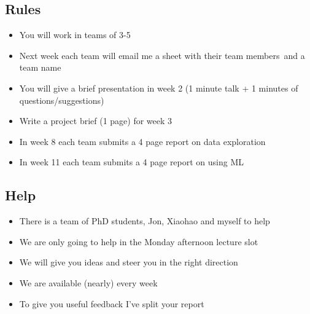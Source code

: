 \setcounter{outlineitem}{1}

\Outline %

\begin{slide}
\section{Rules}

\begin{PauseHighLight}
  \begin{itemize}
  \item You will work in teams of 3-5\pause
  \item Next week each team will email me a sheet with their team
    members\pause\ and a team name\pauseb
  \item You will give a brief presentation in week 2 (1 minute talk + 1
    minutes of questions/suggestions)\pause
  \item Write a project brief (1 page) for week 3\pause
  \item In week 8 each team submits a 4 page report on data exploration\pause
  \item In week 11 each team submits a 4 page report on using ML\pause
  \end{itemize}
\end{PauseHighLight}

\end{slide}


\begin{slide}
\section{Help}

\begin{PauseHighLight}
  \begin{itemize}
  \item There is a team of PhD students, Jon, Xiaohao and myself to help\pause
  \item We are only going to help in the Monday afternoon lecture slot\pause
  \item We will give you ideas and steer you in the right direction\pause
  \item We are available (nearly) every week\pause
  \item To give you useful feedback I've split your report\pause
  \end{itemize}
\end{PauseHighLight}

\end{slide}

